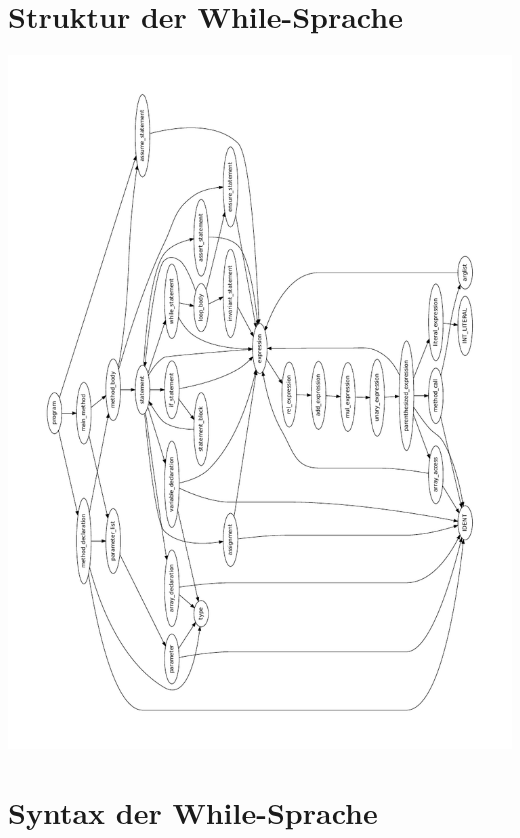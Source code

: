 \documentclass[10pt,a4paper,titlepage]{article}
\begin{document}
\section{Struktur der While-Sprache}
\includegraphics[scale=1]{images/DependencyGraph.pdf}

\section{Syntax der While-Sprache}
\end{document}
